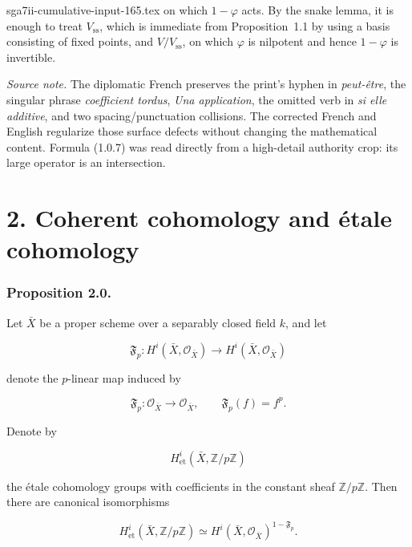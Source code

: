 \begin{filecontents*}{sga7ii-cumulative-input-165.tex}
on which $1-\varphi$ acts. By the snake lemma, it is enough to treat
$V_{\mathrm{ss}}$, which is immediate from Proposition~1.1 by using a basis
consisting of fixed points, and $V/V_{\mathrm{ss}}$, on which $\varphi$ is
nilpotent and hence $1-\varphi$ is invertible.

\medskip
\noindent\emph{Source note.}
The diplomatic French preserves the print's hyphen in \emph{peut-être}, the
singular phrase \emph{coefficient tordus}, \emph{Una application}, the
omitted verb in \emph{si elle additive}, and two spacing/punctuation
collisions. The corrected French and English regularize those surface defects
without changing the mathematical content. Formula (1.0.7) was read directly
from a high-detail authority crop: its large operator is an intersection.

\section*{2. Coherent cohomology and étale cohomology}

\subsubsection*{Proposition 2.0.}
Let $\bar X$ be a proper scheme over a separably closed field $k$, and let

\begin{equation}\tag{2.0.1}
\mathfrak F_p:H^i(\bar X,\mathcal O_{\bar X})
\longrightarrow H^i(\bar X,\mathcal O_{\bar X})
\end{equation}

denote the $p$-linear map induced by

\begin{equation}\tag{2.0.2}
\mathfrak F_p:\mathcal O_{\bar X}\longrightarrow\mathcal O_{\bar X},
\qquad \mathfrak F_p(f)=f^p.
\end{equation}

Denote by

\[
H^i_{\mathrm{et}}(\bar X,\mathbb Z/p\mathbb Z)
\]

the étale cohomology groups with coefficients in the constant sheaf
$\mathbb Z/p\mathbb Z$. Then there are canonical isomorphisms

\begin{equation}\tag{2.0.3}
H^i_{\mathrm{et}}(\bar X,\mathbb Z/p\mathbb Z)
\simeq
H^i(\bar X,\mathcal O_{\bar X})^{1-\mathfrak F_p}.
\end{equation}


\end{filecontents*}
